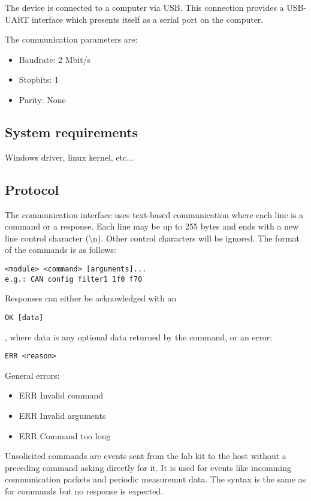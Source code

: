 \documentclass{article}[a4paper]
\begin{document}
The device is connected to a computer via USB. This connection provides a
USB-UART interface which presents itself as a serial port on the computer.

The communication parameters are:
\begin{itemize}
\item Baudrate: 2 Mbit/s
\item Stopbits: 1
\item Parity: None
\end{itemize}

\subsection{System requirements}

Windows driver, linux kernel, etc...

\subsection{Protocol}

The communication interface uses text-based communication where each line is a
command or a response. Each line may be up to 255 bytes and ends with a new
line control character
(\textbackslash n). Other control characters will be ignored. The format of
the commands is as follows:
\begin{verbatim}
<module> <command> [arguments]...
e.g.: CAN config filter1 1f0 f70
\end{verbatim}

Responses can either be acknowledged with an
\begin{verbatim}
OK [data]
\end{verbatim}
, where data is any optional data returned by the command, or an error:
\begin{verbatim}
ERR <reason>
\end{verbatim}

General errors:
\begin{itemize}
\item ERR Invalid command
\item ERR Invalid arguments
\item ERR Command too long
\end{itemize}

Unsolicited commands are events sent from the lab kit to the host without a
preceding command asking directly for it. It is used for events like incomming
communication packets and periodic measuremnt data. The syntax is the same as
for commands but no response is expected.
\end{document}
